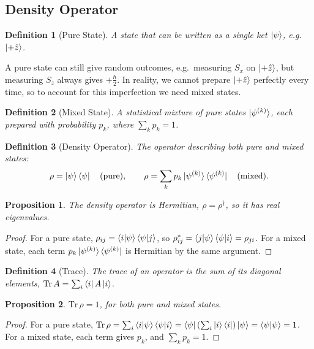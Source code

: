 \documentclass{article}
\newtheorem{definition}{Definition}
\newtheorem{proposition}{Proposition}
\begin{document}
\subsection{Density Operator}
\begin{definition}[Pure State]
    A state that can be written as a single ket $\ket{\psi}$, e.g.\ $\ket{+\hat{z}}$.
\end{definition}
A pure state can still give random outcomes, e.g.\ measuring $S_x$ on $\ket{+\hat{z}}$, but measuring $S_z$ always gives $+\frac{\hbar}{2}$. In reality, we cannot prepare $\ket{+\hat{z}}$ perfectly every time, so to account for this imperfection we need mixed states.
\begin{definition}[Mixed State]
    A statistical mixture of pure states $\ket{\psi^{(k)}}$, each prepared with probability $p_k$, where $\sum_k p_k = 1$.
\end{definition}
\begin{definition}[Density Operator]
    The operator describing both pure and mixed states:
    \begin{equation}
        \rho = \ket{\psi}\bra{\psi} \quad \text{(pure)}, \qquad \rho = \sum_k p_k\ket{\psi^{(k)}}\bra{\psi^{(k)}} \quad \text{(mixed)}.
    \end{equation}
\end{definition}
\begin{proposition}
    The density operator is Hermitian, $\rho = \rho^\dagger$, so it has real eigenvalues.
\end{proposition}
\begin{proof}
    For a pure state, $\rho_{ij} = \braket{i|\psi}\braket{\psi|j}$, so $\rho_{ij}^* = \braket{j|\psi}\braket{\psi|i} = \rho_{ji}$. For a mixed state, each term $p_k\ket{\psi^{(k)}}\bra{\psi^{(k)}}$ is Hermitian by the same argument.
\end{proof}
\begin{definition}[Trace]
    The trace of an operator is the sum of its diagonal elements, $\text{Tr}\,A = \sum_i \bra{i}A\ket{i}$.
\end{definition}
\begin{proposition}
    $\text{Tr}\,\rho = 1$, for both pure and mixed states.
\end{proposition}
\begin{proof}
    For a pure state, $\text{Tr}\,\rho = \sum_i\braket{i|\psi}\braket{\psi|i} = \bra{\psi}\left(\sum_i\ket{i}\bra{i}\right)\ket{\psi} = \braket{\psi|\psi} = 1$. For a mixed state, each term gives $p_k$, and $\sum_k p_k = 1$.
\end{proof}
\end{document}
